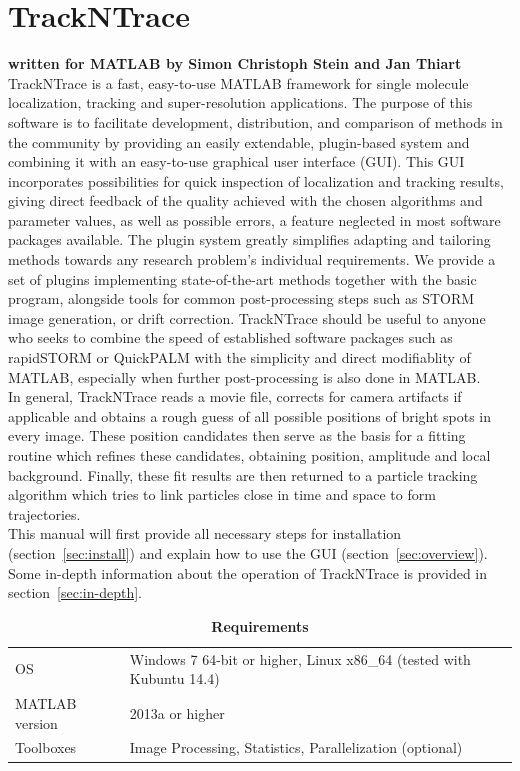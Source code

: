 \documentclass[11pt,onside]{report}
\numberwithin{equation}{chapter}
\begin{document}
\chapter*{TrackNTrace}
\vspace*{-30pt}\textbf{written for MATLAB by Simon Christoph Stein and Jan Thiart}\\ [20pt]
TrackNTrace is a fast, easy-to-use MATLAB framework for single molecule localization, tracking and super-resolution applications. The purpose of this software is to facilitate development, distribution, and comparison of methods in the community by providing an easily extendable, plugin-based system and combining it with an easy-to-use graphical user interface (GUI). This GUI incorporates possibilities for quick inspection of localization and tracking results, giving direct feedback of the quality achieved with the chosen algorithms and parameter values, as well as possible errors, a feature neglected in most software packages available. The plugin system greatly simplifies adapting and tailoring methods towards any research problem's individual requirements. We provide a set of plugins implementing state-of-the-art methods together with the basic program, alongside tools for common post-processing steps such as STORM image generation, or drift correction. TrackNTrace should be useful to anyone who seeks to combine the speed of established software packages such as rapidSTORM or QuickPALM with the simplicity and direct modifiablity of MATLAB, especially when further post-processing is also done in MATLAB.\\
  
In general, TrackNTrace reads a movie file, corrects for camera artifacts if applicable and obtains a rough guess of all possible positions of bright spots in every image. These position candidates then serve as the basis for a fitting routine which refines these candidates, obtaining position, amplitude and local background. Finally, these fit results are then returned to a particle tracking algorithm which tries to link particles close in time and space to form trajectories.\\[10pt]
This manual will first provide all necessary steps for installation (section~\ref{sec:install}) and explain how to use the GUI (section~\ref{sec:overview}). Some in-depth information about the operation of TrackNTrace is provided in section~\ref{sec:in-depth}.
\begin{table}[!h]
\centering
\caption*{\textbf{Requirements}}
\label{tab:requirements}
\begin{tabular}{p{} p{}}
\toprule
OS & Windows 7 64-bit or higher, Linux x86\_64 (tested with Kubuntu 14.4) \\[5pt]
MATLAB version & 2013a or higher\\[5pt]
Toolboxes & Image Processing, Statistics, Parallelization (optional) \\[0pt]
\bottomrule
\end{tabular}
\end{table}
\end{document}
